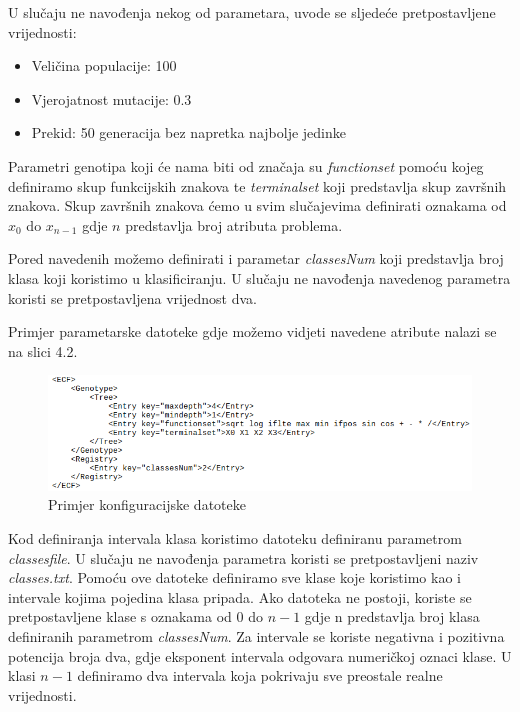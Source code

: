 \documentclass[times, utf8, zavrsni]{fer}
\begin{document}
U slučaju ne navođenja nekog od  parametara, uvode se sljedeće pretpostavljene vrijednosti: 

\begin{itemize}
\item Veličina populacije: 100
\item Vjerojatnost mutacije: 0.3
\item Prekid: 50 generacija bez napretka najbolje jedinke
\end{itemize}

Parametri genotipa koji će nama biti od značaja su \textit{functionset} pomoću kojeg definiramo skup funkcijskih znakova te \textit{terminalset} koji predstavlja skup završnih znakova. Skup završnih znakova ćemo u svim slučajevima definirati oznakama od $x_0$ do $x_{n-1}$ gdje $n$ predstavlja broj atributa problema.

Pored navedenih možemo definirati i parametar \textit{classesNum} koji predstavlja broj klasa koji koristimo u klasificiranju. U slučaju ne navođenja navedenog parametra koristi se pretpostavljena vrijednost dva.

Primjer parametarske datoteke gdje možemo vidjeti navedene atribute nalazi se na slici 4.2.

\begin{figure}[htb]
\centering
\includegraphics[scale=0.6]{images/xml}
\caption{Primjer konfiguracijske datoteke}
\end{figure}

Kod definiranja intervala klasa koristimo datoteku definiranu parametrom \textit{classesfile}. U slučaju ne navođenja parametra koristi se pretpostavljeni naziv \textit{classes.txt}. Pomoću ove datoteke definiramo sve klase koje koristimo kao i intervale kojima pojedina klasa pripada. Ako datoteka ne postoji, koriste se pretpostavljene klase s oznakama od $0$ do $n-1$ gdje n predstavlja broj klasa definiranih parametrom \textit{classesNum}. Za intervale se koriste negativna i pozitivna potencija broja dva, gdje eksponent intervala odgovara numeričkoj oznaci klase. U klasi $n-1$ definiramo dva intervala koja pokrivaju sve preostale realne vrijednosti.
\end{document}
